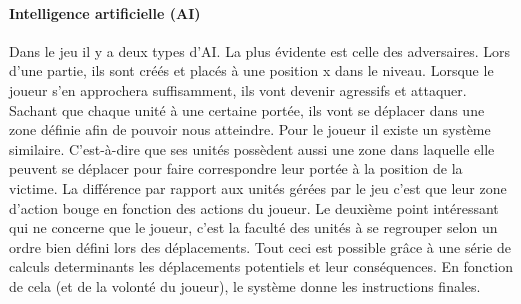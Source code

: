 \documentclass[a4paper,10pt]{article}
\begin{document}
  \paragraph{Intelligence artificielle (AI)}
  Dans le jeu il y a deux types d'AI. La plus évidente est celle des adversaires. Lors d'une partie, ils sont créés et placés à une position x dans le niveau. Lorsque le joueur s'en approchera suffisamment, ils vont devenir agressifs et attaquer. Sachant que chaque unité à une certaine portée, ils vont se déplacer dans une zone définie afin de pouvoir nous atteindre.
  \newline Pour le joueur il existe un système similaire. C'est-à-dire que ses unités possèdent aussi une zone dans laquelle elle peuvent se déplacer pour faire correspondre leur portée à la position de la victime. La différence par rapport aux unités gérées par le jeu c'est que leur zone d'action bouge en fonction des actions du joueur.
  \newline Le deuxième point intéressant qui ne concerne que le joueur, c'est la faculté des unités à se regrouper selon un ordre bien défini lors des déplacements.
  \newline Tout ceci est possible grâce à une série de calculs determinants les déplacements potentiels et leur conséquences. En fonction de cela (et de la volonté du joueur), le système donne les instructions finales.
  
\end{document}
